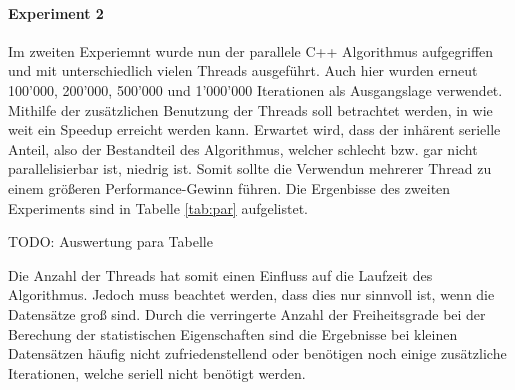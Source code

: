 \documentclass[sigconf]{acmart}
\begin{document}
\begin{table}[htbp]
  \caption{Vergleich der Algorithmen und Ausführungsart über 100'000, 200'000, 500'000 und 1'000'000 Iterationen. Alle Angaben in Sekunden.}
  \label{tab:serpar}
\end{table}

 \paragraph{Experiment 2}

 Im zweiten Experiemnt wurde nun der parallele C++ Algorithmus aufgegriffen und mit unterschiedlich vielen Threads ausgeführt. Auch hier wurden erneut 100'000, 200'000, 500'000 und 1'000'000 Iterationen als Ausgangslage verwendet. Mithilfe der zusätzlichen Benutzung der Threads soll betrachtet werden, in wie weit ein Speedup erreicht werden kann. Erwartet wird, dass der inhärent serielle Anteil, also der Bestandteil des Algorithmus, welcher schlecht bzw. gar nicht parallelisierbar ist, niedrig ist. Somit sollte die Verwendun mehrerer Thread zu einem größeren Performance-Gewinn führen. 
 Die Ergenbisse des zweiten Experiments sind in Tabelle \ref{tab:par} aufgelistet. 

 TODO: Auswertung para Tabelle

 Die Anzahl der Threads hat somit einen Einfluss auf die Laufzeit des Algorithmus. Jedoch muss beachtet werden, dass dies nur sinnvoll ist, wenn die Datensätze groß sind. Durch die verringerte Anzahl der Freiheitsgrade bei der Berechung der statistischen Eigenschaften sind die Ergebnisse bei kleinen Datensätzen häufig nicht zufriedenstellend oder benötigen noch einige zusätzliche Iterationen, welche seriell nicht benötigt werden.

\begin{table}[htbp]
  \caption{Vergleich der des parallelen C++ Algorithmus mit unterschiedlich vielen Threads über 100'000, 200'000, 500'000 und 1'000'000 Iterationen. Alle Angaben in Sekunden.}
  \label{tab:par}
\end{table}
\end{document}
